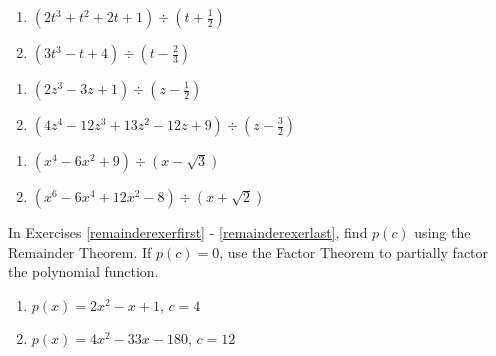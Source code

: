 \documentclass{ximera}
\begin{document}
\begin{multicols}{2}
\begin{enumerate}
\setcounter{enumi}{\value{HW}}

\item $\left(2t^3+t^2+2t+1 \right) \div \left(t + \frac{1}{2} \right)$
\item $\left(3t^3 - t + 4 \right) \div \left(t - \frac{2}{3} \right)$

\setcounter{HW}{\value{enumi}}
\end{enumerate}
\end{multicols}

\begin{multicols}{2}
\begin{enumerate}
\setcounter{enumi}{\value{HW}}

\item $\left(2z^3 - 3z +1 \right) \div \left(z - \frac{1}{2} \right)$
\item $\left(4z^4-12z^3+13z^2 -12z+9\right) \div \left(z - \frac{3}{2} \right)$

\setcounter{HW}{\value{enumi}}
\end{enumerate}
\end{multicols}

\begin{multicols}{2}
\begin{enumerate}
\setcounter{enumi}{\value{HW}}

\item $\left(x^4-6x^2+9 \right) \div \left(x -\sqrt{3} \right)$
\item $\left(x^6-6x^4+12x^2-8\right) \div \left(x +\sqrt{2} \right)$ \label{synthdivreviewlast}

\setcounter{HW}{\value{enumi}}
\end{enumerate}
\end{multicols}

In Exercises \ref{remainderexerfirst} - \ref{remainderexerlast}, find $p(c)$ using the Remainder Theorem.  If $p(c) = 0$, use the Factor Theorem to partially factor the polynomial function.

\begin{multicols}{2}
\begin{enumerate}
\setcounter{enumi}{\value{HW}}

\item $p(x) = 2x^2 - x + 1$, $c = 4$ \label{remainderexerfirst}
\item $p(x) = 4x^2-33x-180$, $c = 12$

\setcounter{HW}{\value{enumi}}
\end{enumerate}
\end{multicols}
\end{document}
